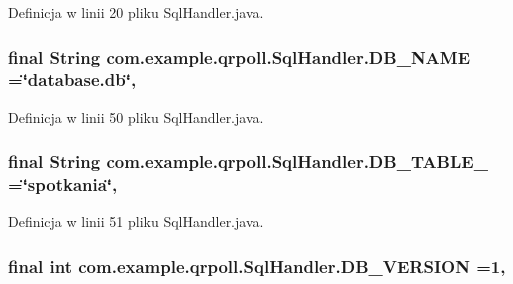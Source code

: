 Definicja w linii 20 pliku Sql\+Handler.\+java.

\hypertarget{classcom_1_1example_1_1qrpoll_1_1_sql_handler_a1e5b9131804451b9c7e6e9cd0eeb7187}{
\subsubsection[{D\+B\+\_\+\+N\+A\+M\+E}]{\setlength{\rightskip}{0pt plus 5cm}final String com.\+example.\+qrpoll.\+Sql\+Handler.\+D\+B\+\_\+\+N\+A\+M\+E =\char`\"{}database.\+db\char`\"{}\hspace{0.3cm}{\ttfamily [static]}, {\ttfamily [private]}}}\label{classcom_1_1example_1_1qrpoll_1_1_sql_handler_a1e5b9131804451b9c7e6e9cd0eeb7187}


Definicja w linii 50 pliku Sql\+Handler.\+java.

\hypertarget{classcom_1_1example_1_1qrpoll_1_1_sql_handler_a5858d638c1d649a755b4f18614481a48}{
\subsubsection[{D\+B\+\_\+\+T\+A\+B\+L\+E\+\_\+1}]{\setlength{\rightskip}{0pt plus 5cm}final String com.\+example.\+qrpoll.\+Sql\+Handler.\+D\+B\+\_\+\+T\+A\+B\+L\+E\+\_ =\char`\"{}spotkania\char`\"{}\hspace{0.3cm}{\ttfamily [static]}, {\ttfamily [private]}}}\label{classcom_1_1example_1_1qrpoll_1_1_sql_handler_a5858d638c1d649a755b4f18614481a48}


Definicja w linii 51 pliku Sql\+Handler.\+java.

\hypertarget{classcom_1_1example_1_1qrpoll_1_1_sql_handler_a10db6c9a4c952c10c3e67c633797a244}{
\subsubsection[{D\+B\+\_\+\+V\+E\+R\+S\+I\+O\+N}]{\setlength{\rightskip}{0pt plus 5cm}final int com.\+example.\+qrpoll.\+Sql\+Handler.\+D\+B\+\_\+\+V\+E\+R\+S\+I\+O\+N =1\hspace{0.3cm}{\ttfamily [static]}, {\ttfamily [private]}}}\label{classcom_1_1example_1_1qrpoll_1_1_sql_handler_a10db6c9a4c952c10c3e67c633797a244}


